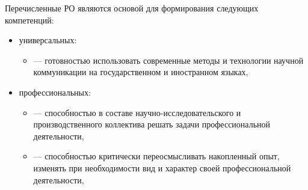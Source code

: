 {Перечисленные РО являются основой для формирования следующих компетенций:
\begin{itemize}
\item универсальных: \begin{itemize}
\item \compone{} — готовностью использовать современные методы и технологии научной коммуникации на государственном и иностранном языках,
\end{itemize}\item профессиональных: \begin{itemize}
\item \comptwo{} — способностью в составе научно-исследовательского и производственного коллектива решать задачи профессиональной деятельности,
\item \compthree{} — способностью критически переосмысливать накопленный опыт, изменять при необходимости вид и характер своей профессиональной деятельности,
\end{itemize}
\end{itemize}
}